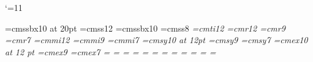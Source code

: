 %
%
%
% 
%
%
% 
%	
%

\catcode`\@=11
			

\parindent0pt		%
\parskip0pt		%

\def\StandardAspect{%
\pdfpagewidth=120mm	%
\pdfpageheight=90mm	%
\vsize=67mm		%
\hsize=110mm		%
\hoffset=-20.4mm	%
\voffset=-12.4mm	%
}

\def\WideAspect{%
\pdfpagewidth=144mm	%
\pdfpageheight=90mm	%
\vsize=67mm		%
\hsize=134mm		%
\hoffset=-20.4mm	%
\voffset=-12.4mm	%
}


%
%
\font\titlefont=cmssbx10 at 20pt %
\font\normalfont=cmss12		 %
\font\slidetitlefont=cmssbx10    %
\font\linkbarfont=cmss8		 %
\font\it=cmti12
%
\baselineskip=15pt
\font\tfont=cmr12
\font\sfont=cmr9
\font\ssfont=cmr7
\font\tifont=cmmi12
\font\sifont=cmmi9
\font\ssifont=cmmi7
\font\tsyfont=cmsy10 at 12pt
\font\ssyfont=cmsy9
\font\sssyfont=cmsy7
\font\texfont=cmex10 at 12 pt
\font\sexfont=cmex9
\font\ssexfont=cmex7
%
=\tfont
{}=\sfont
{}=\ssfont
{}=\tifont
{}=\sifont
{}=\ssifont
{}=\tsyfont
{}=\ssyfont
{}=\sssyfont
{}=\texfont
{}=\sexfont
{}=\ssexfont
%

